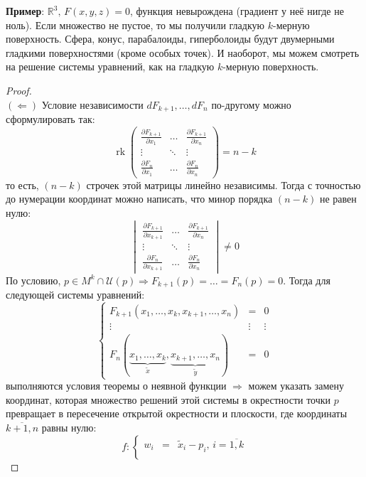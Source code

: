 \documentclass[12pt]{article}
\newcommand{\MR}{\mathbb{R}}
\newcommand{\MU}{\mathcal{U}}
\theoremstyle{definition}
\DeclareMathOperator{\rk}{\text{rk}}
\begin{document}
\textbf{Пример}: $\MR^3, \, F(x,y,z) = 0$, функция невырождена (градиент у неё нигде не ноль). Если множество не пустое, то мы получили гладкую $k$-мерную поверхность. Сфера, конус, парабалоиды, гиперболоиды будут двумерными гладкими поверхностями (кроме особых точек). И наоборот, мы можем смотреть на решение системы уравнений, как на гладкую $k$-мерную поверхность.

\begin{proof}\hfill\\
	$(\Leftarrow)$ Условие независимости $dF_{k+1}, \dotsc, dF_n$ по-другому можно сформулировать так: 
	$$\rk{
		\begin{pmatrix}
			\tfrac{\partial F_{k+1}}{\partial x_1} & \dotsc & \tfrac{\partial F_{k+1}}{\partial x_n} \\
			\vdots & \ddots & \vdots \\
			\tfrac{\partial F_n}{\partial x_1} & \dotsc & \tfrac{\partial F_n}{\partial x_n}
		\end{pmatrix}} = n-k 
	$$ 
	то есть, $(n-k)$ строчек этой матрицы линейно независимы. Тогда с точностью до нумерации координат можно написать, что минор порядка $(n-k)$ не равен нулю:
	$$
		\begin{vmatrix}
			\tfrac{\partial F_{k+1}}{\partial x_{k+1}} & \dotsc & \tfrac{\partial F_{k+1}}{\partial x_n} \\
			\vdots & \ddots & \vdots \\
			\tfrac{\partial F_n}{\partial x_{k+1}} & \dotsc & \tfrac{\partial F_n}{\partial x_n}
		\end{vmatrix} \neq 0
	$$
	По условию, $p \in M^k\cap \MU(p) \Rightarrow F_{k+1}(p) = \dotsc = F_n(p) = 0$.
	Тогда для следующей системы уравнений:
	$$
		\left\{
			\begin{array}{ccc}
				F_{k+1}(x_1,\dotsc , x_k, x_{k+1}, \dotsc, x_n) & = & 0\\
				\vdots & \vdots & \vdots \\
				F_n(\underbrace{x_1,\dotsc, x_k}_{\widetilde{x}}, \underbrace{x_{k+1}, \dotsc, x_n}_{\widetilde{y}}) & = & 0
			\end{array}
		\right.
	$$
	выполняются условия теоремы о неявной функции $\Rightarrow$ можем указать замену координат, которая множество решений этой системы в окрестности точки $p$ превращает в пересечение открытой окрестности и плоскости, где координаты $\overline{k+1, n}$ равны нулю: 
	$$
		f \colon \left\{
		\begin{array}{lcl}
			w_i& = &\widetilde{x}_i - p_i, \, i = \overline{1,k} \\

\end{array}$$
\end{proof}
\end{document}
